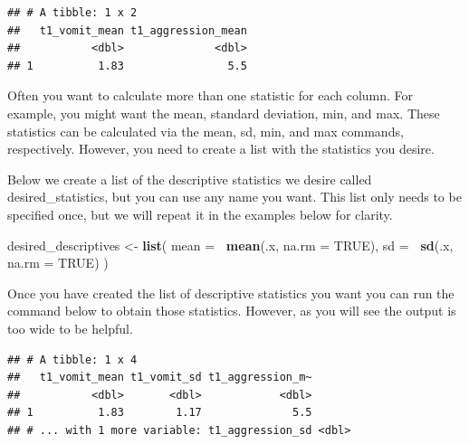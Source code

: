 \documentclass[
]{krantz}
\makeatletter
\newenvironment{Shaded}{\begin{snugshade}}{\end{snugshade}}
\newcommand{\DataTypeTok}[1]{\textcolor[rgb]{0.27,0.27,0.27}{#1}}
\newcommand{\KeywordTok}[1]{\textcolor[rgb]{0.27,0.27,0.27}{\textbf{#1}}}
\newcommand{\NormalTok}[1]{#1}
\newcommand{\OperatorTok}[1]{\textcolor[rgb]{0.43,0.43,0.43}{\textbf{#1}}}
\newcommand{\OtherTok}[1]{\textcolor[rgb]{0.37,0.37,0.37}{#1}}
\newcommand{\StringTok}[1]{\textcolor[rgb]{0.5,0.5,0.5}{#1}}
\newenvironment{kframe}{%
\medskip{}
\setlength{\fboxsep}{.8em}
 \def\at@end@of@kframe{}%
 \ifinner\ifhmode%
  \def\at@end@of@kframe{\end{minipage}}%
  \begin{minipage}{\columnwidth}%
 \fi\fi%
 \def\FrameCommand##1{\hskip\@totalleftmargin \hskip-\fboxsep
 \colorbox{shadecolor}{##1}\hskip-\fboxsep
     \hskip-\linewidth \hskip-\@totalleftmargin \hskip\columnwidth}%
 \MakeFramed {\advance\hsize-\width
   \@totalleftmargin\z@ \linewidth\hsize
   \@setminipage}}%
 {\par\unskip\endMakeFramed%
 \at@end@of@kframe}
\renewenvironment{Shaded}{\begin{kframe}}{\end{kframe}}
\makeatother
\begin{document}
\begin{verbatim}
## # A tibble: 1 x 2
##   t1_vomit_mean t1_aggression_mean
##           <dbl>              <dbl>
## 1          1.83                5.5
\end{verbatim}

Often you want to calculate more than one statistic for each column. For example, you might want the mean, standard deviation, min, and max. These statistics can be calculated via the mean, sd, min, and max commands, respectively. However, you need to create a list with the statistics you desire.

Below we create a list of the descriptive statistics we desire called desired\_statistics, but you can use any name you want. This list only needs to be specified once, but we will repeat it in the examples below for clarity.

\begin{Shaded}
\begin{Highlighting}[]
\NormalTok{desired_descriptives <-}\StringTok{ }\KeywordTok{list}\NormalTok{(}
  \DataTypeTok{mean =} \OperatorTok{~}\KeywordTok{mean}\NormalTok{(.x, }\DataTypeTok{na.rm =} \OtherTok{TRUE}\NormalTok{),}
  \DataTypeTok{sd =} \OperatorTok{~}\KeywordTok{sd}\NormalTok{(.x, }\DataTypeTok{na.rm =} \OtherTok{TRUE}\NormalTok{)}
\NormalTok{)}
\end{Highlighting}
\end{Shaded}

Once you have created the list of descriptive statistics you want you can run the command below to obtain those statistics. However, as you will see the output is too wide to be helpful.

\begin{Shaded}
\end{Shaded}

\begin{verbatim}
## # A tibble: 1 x 4
##   t1_vomit_mean t1_vomit_sd t1_aggression_m~
##           <dbl>       <dbl>            <dbl>
## 1          1.83        1.17              5.5
## # ... with 1 more variable: t1_aggression_sd <dbl>
\end{verbatim}
\end{document}

